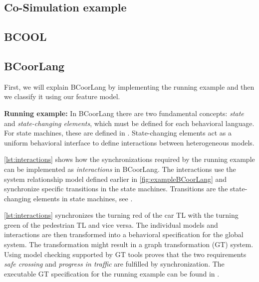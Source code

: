 \documentclass[runningheads]{llncs}
\begin{document}
\subsection{Co-Simulation example} %
\subsection{BCOOL} %
\subsection{BCoorLang}
First, we will explain BCoorLang by implementing the running example and then we classify it using our feature model.

\textbf{Running example:} In BCoorLang there are two fundamental concepts: \textit{state} and \textit{state-changing elements}, which must be defined for each behavioral language.
For state machines, these are defined in \cite{krauterBehavioralConsistencyMultimodeling2023}.
State-changing elements act as a uniform behavioral interface to define interactions between heterogeneous models.

\autoref{lst:interactions} shows how the synchronizations required by the running example can be implemented as \textit{interactions} in BCoorLang.
The interactions use the system relationship model defined earlier in \autoref{fig:exampleBCoorLang} and synchronize specific transitions in the state machines.
Transitions are the state-changing elements in state machines, see  \cite{krauterBehavioralConsistencyMultimodeling2023}.



\autoref{lst:interactions} synchronizes the turning red of the car TL with the turning green of the pedestrian TL and vice versa.
The individual models and interactions are then transformed into a behavioral specification for the global system.
The transformation might result in a graph transformation (GT) system.
Using model checking supported by GT tools proves that the two requirements \textit{safe crossing} and \textit{progress in traffic} are fulfilled by synchronization.
The executable GT specification for the running example can be found in \cite{anonymousauthorsCoordination2024Artifacts2024}.
\end{document}
